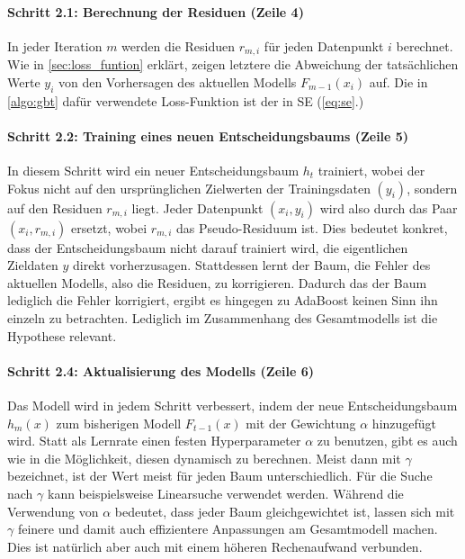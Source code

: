 \paragraph{Schritt 2.1: Berechnung der Residuen (Zeile 4)}
In jeder Iteration \( m \) werden die Residuen \( r_{m,i} \) für jeden Datenpunkt \( i \) berechnet. Wie in \autoref{sec:loss_funtion} erklärt, zeigen letztere die Abweichung der tatsächlichen Werte \( y_i \) von den Vorhersagen des aktuellen Modells \( F_{m-1}(x_i) \) auf. Die in \autoref{algo:gbt} dafür verwendete Loss-Funktion ist der in SE (\ref{eq:se}.)

\paragraph{Schritt 2.2: Training eines neuen Entscheidungsbaums (Zeile 5)}
\label{para:GBT_training_tree}
In diesem Schritt wird ein neuer Entscheidungsbaum \( h_t \) trainiert, wobei der Fokus nicht auf den ursprünglichen Zielwerten der Trainingsdaten \( (y_i) \), sondern auf den Residuen \( r_{m,i} \) liegt. Jeder Datenpunkt \( (x_i, y_i) \) wird also durch das Paar \( (x_i, r_{m,i}) \) ersetzt, wobei \( r_{m,i} \) das Pseudo-Residuum ist.
\newline
Dies bedeutet konkret, dass der Entscheidungsbaum nicht darauf trainiert wird, die eigentlichen Zieldaten \( y \) direkt vorherzusagen. Stattdessen lernt der Baum, die Fehler des aktuellen Modells, also die Residuen, zu korrigieren. Dadurch das der Baum lediglich die Fehler korrigiert, ergibt es hingegen zu AdaBoost keinen Sinn ihn einzeln zu betrachten. Lediglich im Zusammenhang des Gesamtmodells ist die Hypothese relevant.

\paragraph{Schritt 2.4: Aktualisierung des Modells (Zeile 6)}
Das Modell wird in jedem Schritt verbessert, indem der neue Entscheidungsbaum \( h_m(x) \) zum bisherigen Modell \( F_{t-1}(x) \) mit der Gewichtung \( \alpha \) hinzugefügt wird. Statt als Lernrate einen festen Hyperparameter \( \alpha \) zu benutzen, gibt es auch wie in \textcite[S.~345]{Frochte2020} die Möglichkeit, diesen dynamisch zu berechnen. Meist dann mit \( \gamma \) bezeichnet, ist der Wert meist für jeden Baum unterschiedlich. Für die Suche nach \( \gamma \) kann beispielsweise Linearsuche verwendet werden.
\newline
\newline
Während die Verwendung von \( \alpha \) bedeutet, dass jeder Baum gleichgewichtet ist, lassen sich mit \( \gamma \) feinere und damit auch effizientere Anpassungen am Gesamtmodell machen. Dies ist natürlich aber auch mit einem höheren Rechenaufwand verbunden.

